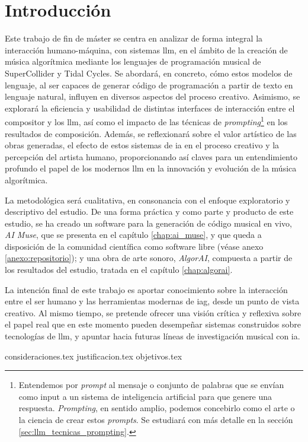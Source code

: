 \chapter{Introducción}



Este trabajo de fin de máster se centra en analizar de forma integral la interacción humano-máquina, con sistemas \gls{llm}, en el ámbito de la creación de música algorítmica mediante los lenguajes de programación musical de SuperCollider y Tidal Cycles. Se abordará, en concreto, cómo estos modelos de lenguaje, al ser capaces de generar código de programación a partir de texto en lenguaje natural, influyen en diversos aspectos del proceso creativo. Asimismo, se explorará la eficiencia y usabilidad de distintas interfaces de interacción entre el compositor y los \gls{llm}, así como el impacto de las técnicas de \emph{prompting}\footnote{Entendemos por \emph{prompt} al mensaje o conjunto de palabras que se envían como input a un sistema de inteligencia artificial para que genere una respuesta. \emph{Prompting}, en sentido amplio, podemos concebirlo como el arte o la ciencia de crear estos \emph{prompts}. Se estudiará con más detalle en la sección \ref{sec:llm_tecnicas_prompting}.} en los resultados de composición. Además, se reflexionará sobre el valor artístico de las obras generadas, el efecto de estos sistemas de \gls{ia} en el proceso creativo y la percepción del artista humano, proporcionando así claves para un entendimiento profundo el papel de los modernos \gls{llm} en la innovación y evolución de la música algorítmica.

La metodológica será cualitativa, en consonancia con el enfoque exploratorio y descriptivo del estudio. De una forma práctica y como parte y producto de este estudio, se ha creado un software para la generación de código musical en vivo, \emph{AI Muse}, que se presenta en el capítulo \ref{chap:ai_muse}, y que queda a disposición de la comunidad científica como software libre (véase anexo \ref{anexo:repositorio}); y una obra de arte sonoro, \emph{AlgorAI}, compuesta a partir de los resultados del estudio, tratada en el capítulo \ref{chap:algorai}.

La intención final de este trabajo es aportar conocimiento sobre la interacción entre el ser humano y las herramientas modernas de \gls{iag}, desde un punto de vista creativo. Al mismo tiempo, se pretende ofrecer una visión crítica y reflexiva sobre el papel real que en este momento pueden desempeñar sistemas construidos sobre tecnologías de \gls{llm}, y apuntar hacia futuras líneas de investigación musical con \gls{ia}.



{consideraciones.tex}
{justificacion.tex}
{objetivos.tex}